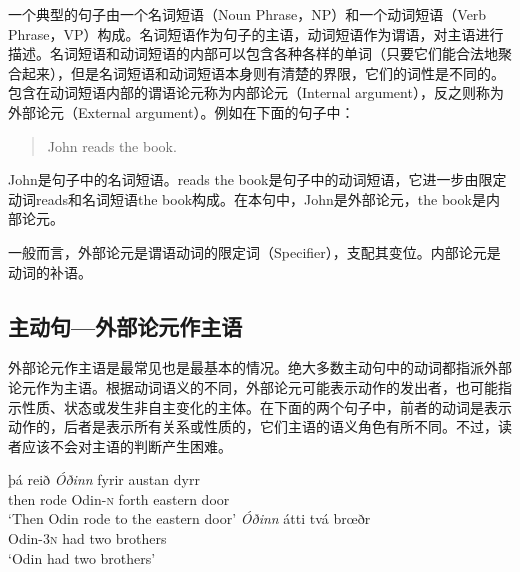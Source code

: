 一个典型的句子由一个名词短语（Noun Phrase，NP）和一个动词短语（Verb Phrase，VP）构成。名词短语作为句子的主语，动词短语作为谓语，对主语进行描述。名词短语和动词短语的内部可以包含各种各样的单词（只要它们能合法地聚合起来），但是名词短语和动词短语本身则有清楚的界限，它们的词性是不同的。包含在动词短语内部的谓语论元称为内部论元（Internal argument），反之则称为外部论元（External argument）。例如在下面的句子中：
\begin{quote}
    John reads the book.
\end{quote}

John是句子中的名词短语。reads the book是句子中的动词短语，它进一步由限定动词reads和名词短语the book构成。在本句中，John是外部论元，the book是内部论元。

一般而言，外部论元是谓语动词的限定词（Specifier），支配其变位。内部论元是动词的补语。
\subsection{主动句—外部论元作主语}
外部论元作主语是最常见也是最基本的情况。绝大多数主动句中的动词都指派外部论元作为主语。根据动词语义的不同，外部论元可能表示动作的发出者，也可能指示性质、状态或发生非自主变化的主体。在下面的两个句子中，前者的动词是表示动作的，后者是表示所有关系或性质的，它们主语的语义角色有所不同。不过，读者应该不会对主语的判断产生困难。
\begin{exe}
    \ex
    \gll    þá	reið	\textit{Óðinn}	fyrir	austan	dyrr\\
    then	rode	Odin-\textsc{n}	forth	eastern	door\\
    \trans `Then Odin rode to the eastern door’
    \ex
    \gll \textit{Óðinn}	átti	tvá	brœðr\\
    Odin-{\footnotesize 3}\textsc{n}	had	two	brothers\\
    \trans `Odin had two brothers’
\end{exe}

